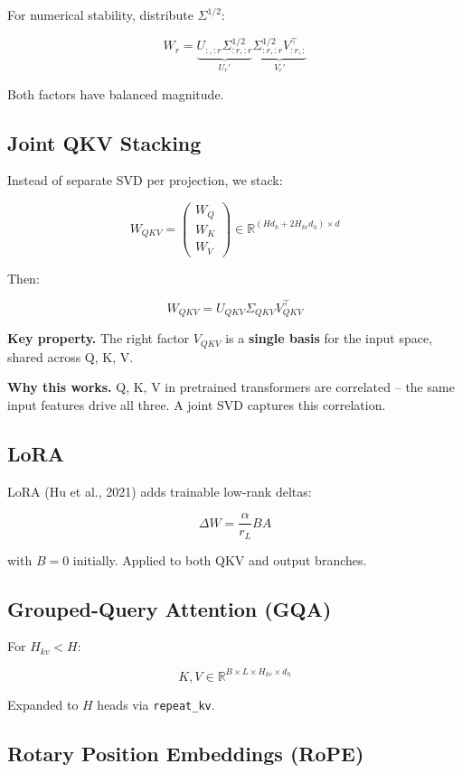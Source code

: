 For numerical stability, distribute $\Sigma^{1/2}$:

\[
W_r = \underbrace{U_{:, :r} \Sigma_{:r, :r}^{1/2}}_{U_r'} \underbrace{\Sigma_{:r, :r}^{1/2} V_{:r, :}^\top}_{V_r'}
\]

Both factors have balanced magnitude.

\subsection{Joint QKV Stacking}

Instead of separate SVD per projection, we stack:

\[
W_{QKV} = \begin{pmatrix} W_Q \\ W_K \\ W_V \end{pmatrix} \in \mathbb{R}^{(H d_h + 2 H_{kv} d_h) \times d}
\]

Then:

\[
W_{QKV} = U_{QKV} \Sigma_{QKV} V_{QKV}^\top
\]

\textbf{Key property.} The right factor $V_{QKV}$ is a \textbf{single basis} for the 
input space, shared across Q, K, V.

\textbf{Why this works.} Q, K, V in pretrained transformers are correlated -- the 
same input features drive all three. A joint SVD captures this correlation.

\subsection{LoRA}

LoRA (Hu et al., 2021) adds trainable low-rank deltas:

\[
\Delta W = \frac{\alpha}{r_L} B A
\]

with $B = 0$ initially. Applied to both QKV and output branches.

\subsection{Grouped-Query Attention (GQA)}

For $H_{kv} < H$:

\[
K, V \in \mathbb{R}^{B \times L \times H_{kv} \times d_h}
\]

Expanded to $H$ heads via \texttt{repeat\_kv}.

\subsection{Rotary Position Embeddings (RoPE)}

